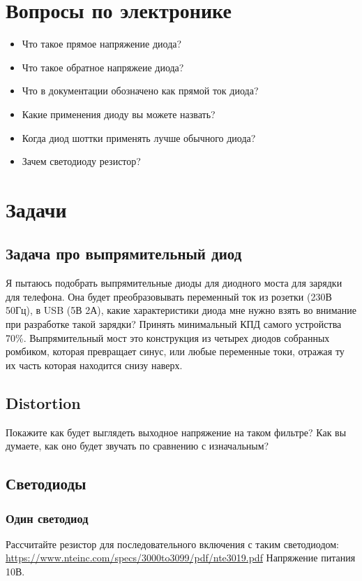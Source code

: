 \documentclass[a4paper,12pt]{article} %
\begin{document}
\section{Вопросы по электронике}

\begin{itemize}
  \item Что такое прямое напряжение диода?
  \item Что такое обратное напряжеие диода?
  \item Что в документации обозначено как прямой ток диода?
  \item Какие применения диоду вы можете назвать?
  \item Когда диод шоттки применять лучше обычного диода?
  \item Зачем светодиоду резистор?
\end{itemize}

\section{Задачи}
  \subsection{Задача про выпрямительный диод}
Я пытаюсь подобрать выпрямительные диоды для диодного моста для зарядки для телефона. Она будет преобразовывать переменный ток из розетки (230В 50Гц), в USB (5В 2А), какие характеристики диода мне нужно взять во внимание при разработке такой зарядки? Принять минимальный КПД самого устройства 70\%. Выпрямительный мост это конструкция из четырех диодов собранных ромбиком, которая превращает синус, или любые переменные токи, отражая ту их часть которая находится снизу наверх.

  \subsection{Distortion}
  Покажите как будет выглядеть выходное напряжение на таком фильтре? Как вы думаете, как оно будет звучать по сравнению с изначальным?

  \subsection{Светодиоды}

  \subsubsection{Один светодиод}
  Рассчитайте резистор для последовательного включения с таким светодиодом: \url{https://www.nteinc.com/specs/3000to3099/pdf/nte3019.pdf} Напряжение питания 10В.
\end{document}
